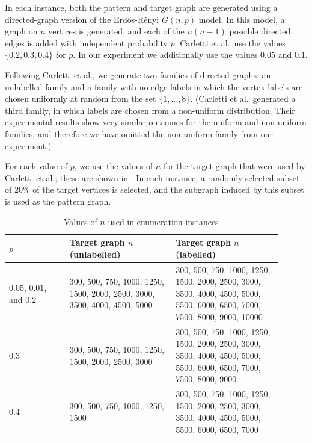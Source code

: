 In each instance, both the pattern and target graph are generated using a directed-graph
version of the Erd\H{o}s-Rényi $G(n,p)$ model.  In this model, a graph on $n$ vertices
is generated, and each of the $n(n-1)$ possible directed edges is added with independent
probability $p$.  Carletti et al.\ use the values $\{0.2, 0.3, 0.4\}$ for $p$. In our experiment
we additionally use the values $0.05$ and $0.1$.

Following Carletti et al., we generate two families of directed graphs: an unlabelled family
and a family with no edge labels in which the vertex labels are chosen uniformly at random
from the set $\{1,\dots,8\}$.  (Carletti et al.\ generated a third family, in which labels
are chosen from a non-uniform distribution.  Their experimental results show very similar
outcomes for the uniform and non-uniform families, and therefore we have omitted the non-uniform
family from our experiment.)

For each value of $p$, we use the values
of $n$ for the target graph that were used by Carletti et al.; these are shown in .
In each instance, a randomly-selected subset of $20\%$ of the target vertices is selected,
and the subgraph induced by this subset is used as the pattern graph.

\FloatBarrier

\begin{table}[h!]
\centering
\footnotesize
 \begin{tabular}{p{0.2\linewidth} p{0.35\linewidth} p{0.35\linewidth}}
 \toprule
     $p$ & Target graph $n$ (unlabelled) & Target graph $n$ (labelled) \\ [0.5ex]
 \midrule
     $0.05$, $0.01$, and $0.2$ &
         300, 500, 750, 1000, 1250, 1500, 2000, 2500, 3000, 3500, 4000, 4500, 5000 &
         300, 500, 750, 1000, 1250, 1500, 2000, 2500, 3000, 3500, 4000, 4500, 5000,
         5500, 6000, 6500, 7000, 7500, 8000, 9000, 10000\\
     \rule{0pt}{2.3ex}$0.3$ & 
        300, 500, 750, 1000, 1250, 1500, 2000, 2500, 3000 &
        300, 500, 750, 1000, 1250, 1500, 2000, 2500, 3000, 3500, 4000, 4500, 5000,
        5500, 6000, 6500, 7000, 7500, 8000, 9000 \\
     \rule{0pt}{2.3ex}$0.4$ & 300, 500, 750, 1000, 1250, 1500 &
        300, 500, 750, 1000, 1250, 1500, 2000, 2500, 3000, 3500, 4000, 4500, 5000, 5500, 6000, 6500, 7000 \\
 \bottomrule
\end{tabular}
\caption{Values of $n$ used in enumeration instances}
\label{tab:carletti-n}
\end{table}

